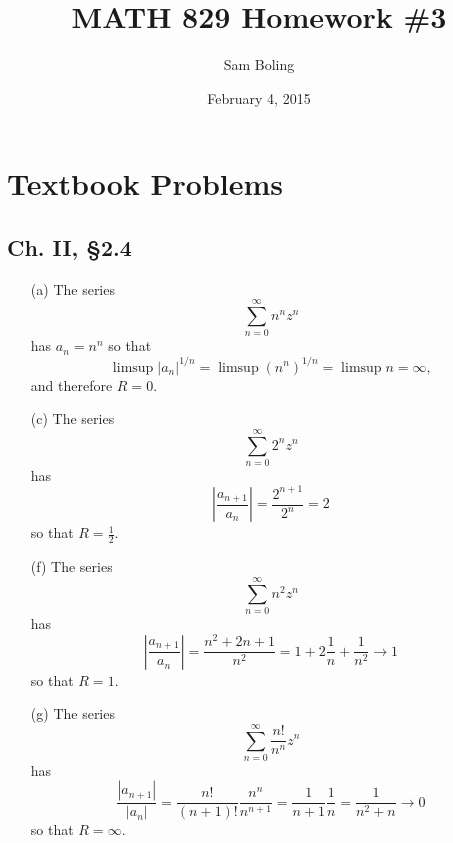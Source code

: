 \documentclass{article}
\title{MATH 829 Homework \#3}
\date{February 4, 2015}
\author{Sam Boling}
\newcounter{Problem}
\begin{document}
\begin{titlepage}
\maketitle
\end{titlepage}

\section{Textbook Problems}

\subsection*{Ch. II, \S 2.4}
\begin{itemize}
  \item[(a)]{
    The series
    $$
    \sum_{n=0}^\infty n^n z^n
    $$
    has $a_n = n^n$ so that
    $$
      \limsup |a_n|^{1 / n}
    = \limsup (n^n)^{1 / n}
    = \limsup n = \infty,
    $$
    and therefore $R = 0$.
  }
  \item[(c)]{
    The series
    $$
    \sum_{n=0}^\infty 2^n z^n
    $$
    has
    $$
      \left|\frac{a_{n+1}}{a_n}\right|
    = \frac{2^{n+1}}{2^n}
    = 2
    $$
    so that $R = \frac{1}{2}$.
  }
  \item[(f)]{
    The series
    $$
    \sum_{n=0}^\infty n^2 z^n
    $$
    has
    $$
      \left|\frac{a_{n+1}}{a_n}\right|
    = \frac{n^2 + 2n + 1}{n^2}
    = 1 + 2\frac{1}{n} + \frac{1}{n^2} \to 1
    $$
    so that $R = 1$.
  }
  \item[(g)]{
    The series
    $$
    \sum_{n=0}^\infty \frac{n!}{n^n} z^n
    $$
    has
    $$
      \frac{|a_{n+1}|}{|a_n|}
    = \frac{n!}{(n+1)!}\frac{n^n}{n^{n+1}}
    = \frac{1}{n+1}\frac{1}{n}
    = \frac{1}{n^2 + n} \to 0
    $$
    so that $R = \infty$.
  }
\end{itemize}
\end{document}

